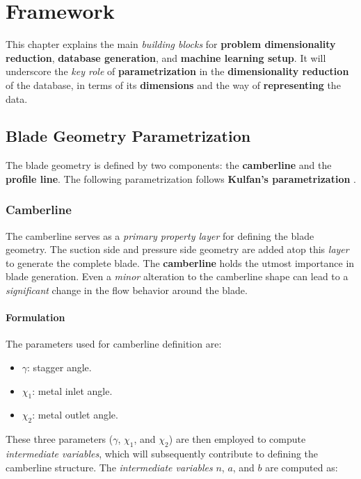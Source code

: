 \chapter{Framework}
\label{chapter:framework}

This chapter explains the main \textit{building blocks} for \textbf{problem dimensionality reduction}, \textbf{database generation}, and \textbf{machine learning setup}. It will underscore the \textit{key role} of \textbf{parametrization} in the \textbf{dimensionality reduction} of the database, in terms of its \textbf{dimensions} and the way of \textbf{representing} the data.

\section{Blade Geometry Parametrization}

The blade geometry is defined by two components: the \textbf{camberline} and the \textbf{profile line}. The following parametrization follows \textbf{Kulfan's parametrization} \cite{kulfan2008universal}.

\subsection{Camberline}

The camberline serves as a \textit{primary property layer} for defining the blade geometry. The suction side and pressure side geometry are added atop this \textit{layer} to generate the complete blade. The \textbf{camberline} holds the utmost importance in blade generation. Even a \textit{minor} alteration to the camberline shape can lead to a \textit{significant} change in the flow behavior around the blade.

\subsubsection{Formulation}

The parameters used for camberline definition are:

\begin{itemize}
  \item $\gamma$: stagger angle.
  \item $\chi_1$: metal inlet angle.
  \item $\chi_2$: metal outlet angle.
\end{itemize}

These three parameters ($\gamma$, $\chi_1$, and $\chi_2$) are then employed to compute \textit{intermediate variables}, which will subsequently contribute to defining the camberline structure. The \textit{intermediate variables} $n$, $a$, and $b$ are computed as:

